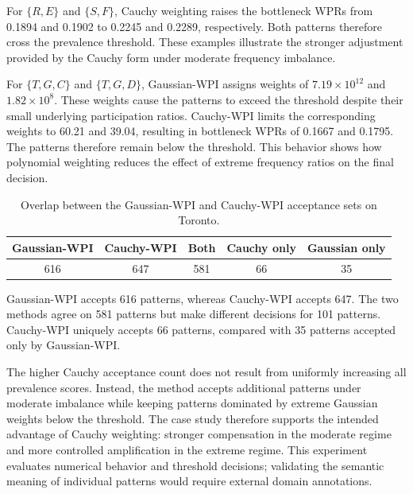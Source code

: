 \documentclass[12pt, letterpaper]{template}
\theoremstyle{definition}
\begin{document}
For $\{R,E\}$ and $\{S,F\}$, Cauchy weighting raises the bottleneck WPRs
from 0.1894 and 0.1902 to 0.2245 and 0.2289, respectively. Both patterns
therefore cross the prevalence threshold. These examples illustrate the
stronger adjustment provided by the Cauchy form under moderate frequency
imbalance.

For $\{T,G,C\}$ and $\{T,G,D\}$, Gaussian-WPI assigns weights of
$7.19{\times}10^{12}$ and $1.82{\times}10^{8}$. These weights cause the
patterns to exceed the threshold despite their small underlying participation
ratios. Cauchy-WPI limits the corresponding weights to 60.21 and 39.04,
resulting in bottleneck WPRs of 0.1667 and 0.1795. The patterns therefore
remain below the threshold. This behavior shows how polynomial weighting
reduces the effect of extreme frequency ratios on the final decision.

\begin{table}[tbp]
\centering
\small
\caption{Overlap between the Gaussian-WPI and Cauchy-WPI acceptance sets
on Toronto.}
\label{tab:pattern_counts}
\begin{tabular}{ccccc}
\toprule
\textbf{Gaussian-WPI} &
\textbf{Cauchy-WPI} &
\textbf{Both} &
\textbf{Cauchy only} &
\textbf{Gaussian only} \\
\midrule
616 & 647 & 581 & 66 & 35 \\
\bottomrule
\end{tabular}
\end{table}

Gaussian-WPI accepts 616 patterns, whereas Cauchy-WPI accepts 647. The two
methods agree on 581 patterns but make different decisions for 101 patterns.
Cauchy-WPI uniquely accepts 66 patterns, compared with 35 patterns accepted
only by Gaussian-WPI.

The higher Cauchy acceptance count does not result from uniformly increasing
all prevalence scores. Instead, the method accepts additional patterns under
moderate imbalance while keeping patterns dominated by extreme Gaussian
weights below the threshold. The case study therefore supports the intended
advantage of Cauchy weighting: stronger compensation in the moderate regime
and more controlled amplification in the extreme regime. This experiment
evaluates numerical behavior and threshold decisions; validating the semantic
meaning of individual patterns would require external domain annotations.

\FloatBarrier

\end{document}
